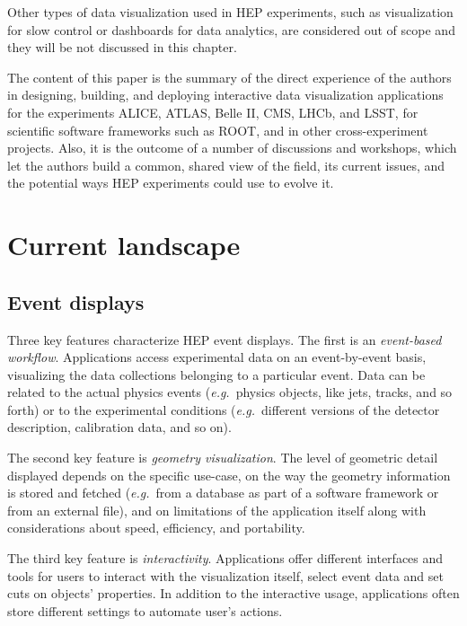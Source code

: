 \documentclass[12pt,a4paper]{article}
\begin{document}
Other types of data visualization used in HEP experiments, such as visualization for slow control
or dashboards for data analytics, are considered out of scope and they will be not discussed in this chapter.

The content of this paper is the summary of the direct experience of the authors in designing, building, and deploying interactive data visualization applications for the experiments ALICE, ATLAS, Belle II, CMS, LHCb, and LSST, for scientific software frameworks such as ROOT, and in other cross-experiment projects. Also, it is the outcome of a number of discussions and workshops, which let the authors build a common, shared view of the field, its current issues, and the potential ways HEP experiments could use to evolve it.


\hypertarget{current-landscape}{%
\section{Current landscape}\label{current-landscape}}

\hypertarget{event-displays}{%
\subsection{Event displays}\label{event-displays}}

Three key features characterize HEP event displays. The first is an \emph{event-based workflow}. Applications access
experimental data on an event-by-event basis,
visualizing the data collections belonging to a particular event. Data can be related to the
actual physics events ({\it e.g.}\ physics objects, like jets, tracks, and so forth) or to the experimental
conditions ({\it e.g.}\ different versions of the detector description, calibration data, and so on).

The second key feature is \emph{geometry visualization}.
The level of geometric detail displayed depends on the specific use-case, on the way the geometry information is stored and fetched ({\it e.g.}\ from a database as part of a software framework or from an external file), and on limitations of the application itself along with
considerations about speed, efficiency, and portability.

The third key feature is \emph{interactivity}. Applications offer different interfaces and tools for users to interact
with the visualization itself, select event data and set cuts on objects' properties.
In addition to the interactive usage, applications often store different settings to automate user’s actions.
\end{document}
